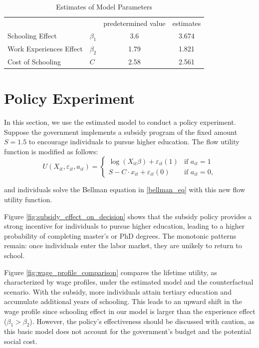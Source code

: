 \documentclass[a4paper, 12pt]{article}
\begin{document}
\begin{table}[hpbt]
\centering
\begin{tabular}{llcc}
\toprule
& & predetermined value & estimates \\
\cmidrule{2-4}
Schooling Effect & $\beta_1$ & 3.6 & 3.674 \\
\addlinespace
Work Experiences Effect & $\beta_2$ & 1.79  & 1.821 \\ 
\addlinespace
Cost of Schooling & $C$ & 2.58 & 2.561 \\
\bottomrule
\end{tabular}
\caption{Estimates of Model Parameters}
\label{est_paras}
\end{table}


\section{Policy Experiment}
In this section, we use the estimated model to conduct a policy experiment.
Suppose the government implements a subsidy program of the fixed amount $S=1.5$ to encourage individuals to pursue higher education.
The flow utility function is modified as follows:
\begin{equation}
U(X_{it},\varepsilon_{it}, a_{it}) =
\begin{cases}
    \log \left(X_{it}\beta\right) + \varepsilon_{it}(1) & \text{if } a_{it} = 1 \\
    S-C\cdot x_{it} + \varepsilon_{it}(0) & \text{if } a_{it} = 0,
\end{cases}
\end{equation}

and individuals solve the Bellman equation in \eqref{bellman_eq} with this new flow utility function.

Figure \eqref{fig:subsidy_effect_on_decision} shows that the subsidy policy provides a strong incentive 
for individuals to pursue higher education, leading to a higher probability of completing master's or PhD degrees.
The monotonic patterns remain: once individuals enter
the labor market, they are unikely to return to school.

Figure \eqref{fig:wage_profile_comparison} compares the lifetime utility, as characterized by wage profiles, under the estimated model and the counterfactual scenario.
With the subsidy, more individuals attain tertiary education and accumulate additional years of schooling.
This leads to an upward shift in the wage profile since schooling effect in our model is larger than the experience effect ($\beta_1>\beta_2$).
However, the policy's effectiveness should be discussed with caution, as this basic model does not account for the government's budget and the potential social cost.
\end{document}
